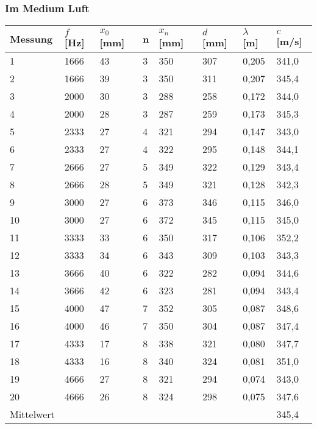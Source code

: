 \documentclass{scrartcl}
\begin{document}
\subsubsection{Im Medium Luft}
\begin{table}[h!]
\begin{tabular}{l|l|l|l|l|l|l|l}
Messung & $f$ {[}Hz{]} & $x_{0}$ [mm] & n & $x_{n}$ [mm] & $d$ [mm]   & $\lambda$ [m]      & $c$ [m/s]      \\
\hline
1       & 1666       & 43                & 3 & 350               & 307 & 0,205 & 341,0 \\
2       & 1666       & 39                & 3 & 350               & 311 & 0,207 & 345,4 \\
3       & 2000       & 30                & 3 & 288               & 258 & 0,172 & 344,0 \\
4       & 2000       & 28                & 3 & 287               & 259 & 0,173 & 345,3 \\
5       & 2333       & 27                & 4 & 321               & 294 & 0,147 & 343,0 \\
6       & 2333       & 27                & 4 & 322               & 295 & 0,148 & 344,1 \\
7       & 2666       & 27                & 5 & 349               & 322 & 0,129 & 343,4 \\
8       & 2666       & 28                & 5 & 349               & 321 & 0,128 & 342,3 \\
9       & 3000       & 27                & 6 & 373               & 346 & 0,115 & 346,0 \\
10      & 3000       & 27                & 6 & 372               & 345 & 0,115 & 345,0 \\
11      & 3333       & 33                & 6 & 350               & 317 & 0,106 & 352,2 \\
12      & 3333       & 34                & 6 & 343               & 309 & 0,103 & 343,3 \\
13      & 3666       & 40                & 6 & 322               & 282 & 0,094 & 344,6 \\
14      & 3666       & 42                & 6 & 323               & 281 & 0,094 & 343,4 \\
15      & 4000       & 47                & 7 & 352               & 305 & 0,087 & 348,6 \\
16      & 4000       & 46                & 7 & 350               & 304 & 0,087 & 347,4 \\
17      & 4333       & 17                & 8 & 338               & 321 & 0,080 & 347,7 \\
18      & 4333       & 16                & 8 & 340               & 324 & 0,081 & 351,0 \\
19      & 4666       & 27                & 8 & 321               & 294 & 0,074 & 343,0 \\
20      & 4666       & 26                & 8 & 324               & 298 & 0,075 & 347,6 \\
\hline
Mittelwert & & & & & & & 345,4
\end{tabular}
\end{table}
\end{document}
